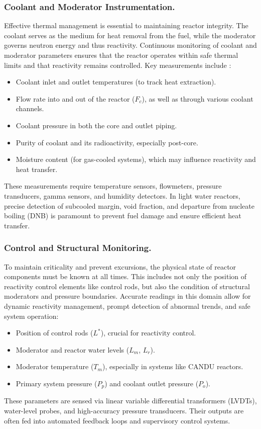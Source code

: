 \documentclass[12pt]{article}
\begin{document}
\subsubsection*{Coolant and Moderator Instrumentation.}
Effective thermal management is essential to maintaining reactor integrity. The coolant serves as the medium for heat removal from the fuel, while the moderator governs neutron energy and thus reactivity. Continuous monitoring of coolant and moderator parameters ensures that the reactor operates within safe thermal limits and that reactivity remains controlled. Key measurements include \autocite{ichandbook}:
\begin{itemize}
  \item Coolant inlet and outlet temperatures (to track heat extraction).
  \item Flow rate into and out of the reactor ($F_c$), as well as through various coolant channels.
  \item Coolant pressure in both the core and outlet piping.
  \item Purity of coolant and its radioactivity, especially post-core.
  \item Moisture content (for gas-cooled systems), which may influence reactivity and heat transfer.
\end{itemize}
These measurements require temperature sensors, flowmeters, pressure transducers, gamma sensors, and humidity detectors. In light water reactors, precise detection of subcooled margin, void fraction, and departure from nucleate boiling (DNB) is paramount to prevent fuel damage and ensure efficient heat transfer.

\subsubsection*{Control and Structural Monitoring.}
To maintain criticality and prevent excursions, the physical state of reactor components must be known at all times. This includes not only the position of reactivity control elements like control rods, but also the condition of structural moderators and pressure boundaries. Accurate readings in this domain allow for dynamic reactivity management, prompt detection of abnormal trends, and safe system operation:
\begin{itemize}
  \item Position of control rods ($L^*$), crucial for reactivity control.
  \item Moderator and reactor water levels ($L_m$, $L_r$).
  \item Moderator temperature ($T_m$), especially in systems like CANDU reactors.
  \item Primary system pressure ($P_p$) and coolant outlet pressure ($P_o$).
\end{itemize}
These parameters are sensed via linear variable differential transformers (LVDTs), water-level probes, and high-accuracy pressure transducers. Their outputs are often fed into automated feedback loops and supervisory control systems.
\end{document}
